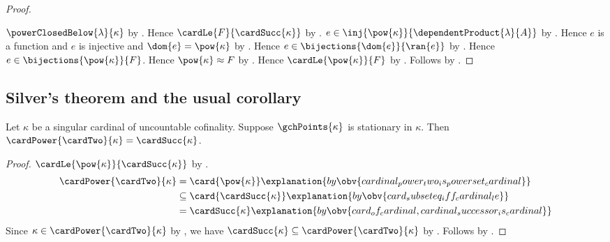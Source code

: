 \begin{proof}
\begin{subproof}
    \end{subproof}
    $\powerClosedBelow{\lambda}{\kappa}$
        by .
    Hence $\cardLe{F}{\cardSucc{\kappa}}$
        by .
    $e\in\inj{\pow{\kappa}}{\dependentProduct{\lambda}{A}}$
        by .
    Hence $e$ is a function and $e$ is injective and $\dom{e}=\pow{\kappa}$
        by .
    Hence $e\in\bijections{\dom{e}}{\ran{e}}$
        by .
    Hence $e\in\bijections{\pow{\kappa}}{F}$.
    Hence $\pow{\kappa}\approx F$ by .
    Hence $\cardLe{\pow{\kappa}}{F}$ by .
    Follows by .
\end{proof}

\subsection{Silver's theorem and the usual corollary}

\begin{theorem}[Silver]\label{silver_theorem_stationary}
    Let $\kappa$ be a singular cardinal of uncountable cofinality.
    Suppose $\gchPoints{\kappa}$ is stationary in $\kappa$.
    Then $\cardPower{\cardTwo}{\kappa}=\cardSucc{\kappa}$.
\end{theorem}
\begin{proof}
    $\cardLe{\pow{\kappa}}{\cardSucc{\kappa}}$
        by .
    \begin{align*}
        \cardPower{\cardTwo}{\kappa}
            &= \card{\pow{\kappa}}
                \explanation{by \obv{cardinal_power_two_is_powerset_cardinal}}
            \\
            &\subseteq \card{\cardSucc{\kappa}}
                \explanation{by \obv{card_subseteq_iff_cardinal_le}}
            \\
            &= \cardSucc{\kappa}
                \explanation{by \obv{card_of_cardinal,cardinal_successor_is_cardinal}}
    \end{align*}
    Since $\kappa\in\cardPower{\cardTwo}{\kappa}$
        by ,
        we have $\cardSucc{\kappa}\subseteq\cardPower{\cardTwo}{\kappa}$
        by .
    Follows by .
\end{proof}


